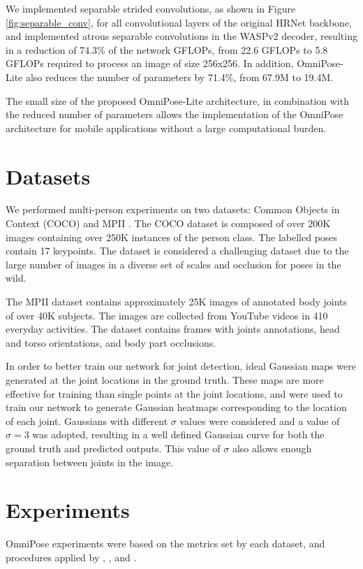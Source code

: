 \documentclass[10pt,twocolumn,letterpaper]{article}
\begin{document}
We implemented separable strided convolutions, as shown in Figure \ref{fig:separable_conv}, for all convolutional layers of the original HRNet backbone, and implemented atrous separable convolutions in the WASPv2 decoder, resulting in a reduction of 74.3\% of the network GFLOPs, from 22.6 GFLOPs to 5.8 GFLOPs required to process an image of size 256x256. In addition, OmniPose-Lite also reduces the number of parameters by 71.4\%, from 67.9M to 19.4M.

The small size of the proposed OmniPose-Lite architecture, in combination with the reduced number of parameters allows the implementation of the OmniPose architecture for mobile applications without a large computational burden.

\section{Datasets}
We performed multi-person experiments on two datasets: Common Objects in Context (COCO) \cite{COCO} and MPII \cite{MPII}.  
The COCO dataset \cite{COCO} is composed of over 200K images containing over 250K instances of the person class. The labelled poses contain 17 keypoints. The dataset is considered a challenging dataset due to the large number of images in a diverse set of scales and occlusion for poses in the wild.

The MPII dataset \cite{MPII} contains approximately 25K images of annotated body joints of over 40K subjects. The images are collected from YouTube videos in 410 everyday activities. The dataset contains frames with joints annotations, head and torso orientations, and body part occlusions.

In order to better train our network for joint detection, ideal Gaussian maps were generated at the joint locations in the ground truth.
These maps are more effective for training than single points at the joint locations, and were used to train our network to generate Gaussian heatmaps corresponding to the location of each joint.
Gaussians with different $\sigma$ values were considered and a value of $\sigma=3$ was adopted, resulting in a well defined Gaussian curve for both the ground truth and predicted outputs. This value of $\sigma$ also allows enough separation between joints in the image.

\section{Experiments}
OmniPose experiments were based on the metrics set by each dataset, and procedures applied by \cite{HRNet}, \cite{HigherHRNet}, and \cite{DarkPose}.
\end{document}
